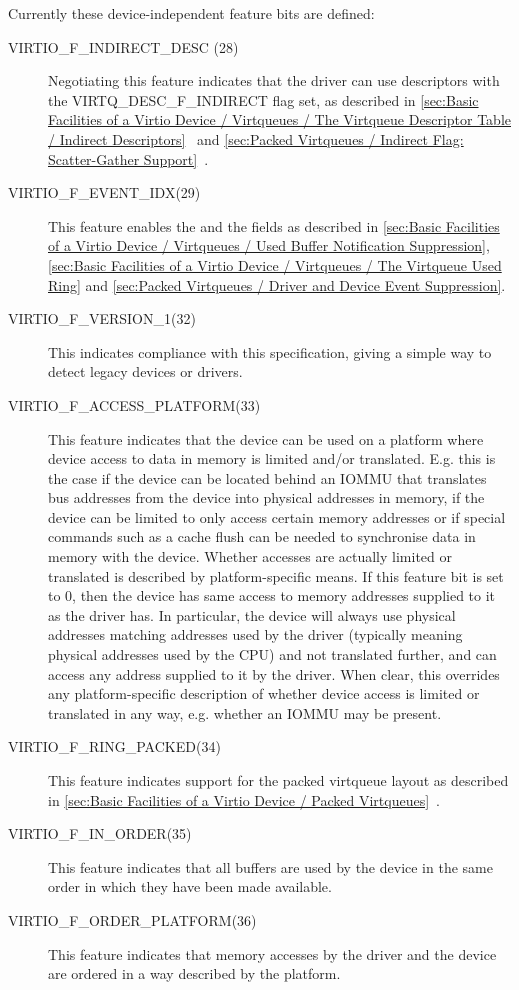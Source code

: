 Currently these device-independent feature bits are defined:

\begin{description}
  \item[VIRTIO_F_INDIRECT_DESC (28)] Negotiating this feature indicates
  that the driver can use descriptors with the VIRTQ_DESC_F_INDIRECT
  flag set, as described in \ref{sec:Basic Facilities of a Virtio
Device / Virtqueues / The Virtqueue Descriptor Table / Indirect
Descriptors}~ and \ref{sec:Packed Virtqueues / Indirect Flag: Scatter-Gather Support}~.
  \item[VIRTIO_F_EVENT_IDX(29)] This feature enables the 
  and the  fields as described in
\ref{sec:Basic Facilities of a Virtio Device / Virtqueues / Used Buffer Notification Suppression}, \ref{sec:Basic Facilities of a Virtio Device / Virtqueues / The Virtqueue Used Ring} and \ref{sec:Packed Virtqueues / Driver and Device Event Suppression}.


  \item[VIRTIO_F_VERSION_1(32)] This indicates compliance with this
    specification, giving a simple way to detect legacy devices or drivers.

  \item[VIRTIO_F_ACCESS_PLATFORM(33)] This feature indicates that
  the device can be used on a platform where device access to data
  in memory is limited and/or translated. E.g. this is the case if the device can be located
  behind an IOMMU that translates bus addresses from the device into physical
  addresses in memory, if the device can be limited to only access
  certain memory addresses or if special commands such as
  a cache flush can be needed to synchronise data in memory with
  the device. Whether accesses are actually limited or translated
  is described by platform-specific means.
  If this feature bit is set to 0, then the device
  has same access to memory addresses supplied to it as the
  driver has.
  In particular, the device will always use physical addresses
  matching addresses used by the driver (typically meaning
  physical addresses used by the CPU)
  and not translated further, and can access any address supplied to it by
  the driver. When clear, this overrides any platform-specific description of
  whether device access is limited or translated in any way, e.g.
  whether an IOMMU may be present.
  \item[VIRTIO_F_RING_PACKED(34)] This feature indicates
  support for the packed virtqueue layout as described in
  \ref{sec:Basic Facilities of a Virtio Device / Packed Virtqueues}~.
  \item[VIRTIO_F_IN_ORDER(35)] This feature indicates
  that all buffers are used by the device in the same
  order in which they have been made available.
  \item[VIRTIO_F_ORDER_PLATFORM(36)] This feature indicates
  that memory accesses by the driver and the device are ordered
  in a way described by the platform.


\end{description}
